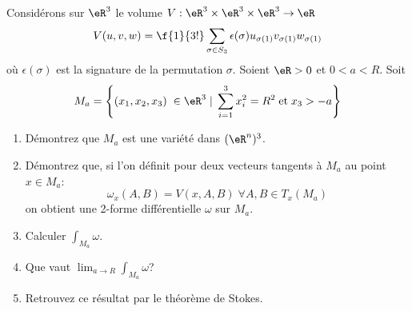 
\begin{exercice}\label{exoVariete0020}

Considérons sur $\eR^3$ le volume $V:\eR^3\times\eR^3\times\eR^3\rightarrow \eR$ \[V(u,v,w)=\f{1}{3!}\sum_{\sigma\in S_3}\epsilon(\sigma)u_{\sigma(1)}v_{\sigma(1)}w_{\sigma(1)}\] où $\epsilon(\sigma)$ est la signature de la permutation $\sigma$. Soient $\eR>0$ et $0<a<R$. Soit \[M_a=\left\{ ( x_1, x_2, x_3)\; \in \eR^3 \; | \; \sum_{i=1}^3x_i^2 = R^2 \; {\rm et} \; x_3>-a\right\}\]
\begin{enumerate}
\item Démontrez que $M_a$ est une variété dans $(\eR^n)^3$.
\item Démontrez que, si l'on définit pour deux vecteurs tangents à $M_a$ au point $x\in M_a$: \[\omega_x(A,B)=V(x,A,B) \; \forall A, B \in T_x(M_a)\] on obtient une 2-forme différentielle $\omega$ sur $M_a$.
\item Calculer $\int_{M_a}\omega$.
\item Que vaut $\lim_{a\rightarrow  R} \int_{M_a}\omega$?
\item Retrouvez ce résultat par le théorème de Stokes.
\end{enumerate}


\end{exercice}
